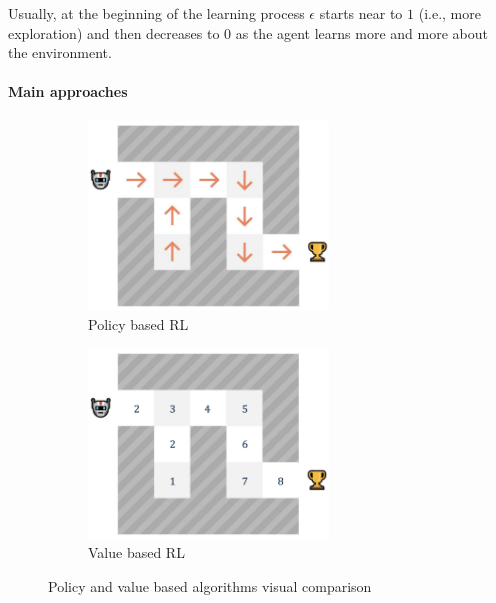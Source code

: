 \documentclass[12pt,a4paper,openright,twoside]{book}
\begin{document}
    Usually, at the beginning of the learning process $\epsilon$ starts near to $1$ (i.e., more exploration) and then decreases
    to $0$ as the agent learns more and more about the environment. 

\paragraph{Main approaches} %

\begin{figure}[t]
    \begin{subfigure}[b]{0.49\textwidth}
        \centering
        \includegraphics[width=0.7\textwidth]{figures/policy-based-rl.png}
        \caption{Policy based RL}
        \label{fig:policy-based-rl}
    \end{subfigure}
    \begin{subfigure}[b]{0.49\textwidth}
        \centering
        \includegraphics[width=0.7\textwidth]{figures/value-based-rl.png}
        \caption{Value based RL}
        \label{fig:value-based-rl}
    \end{subfigure}
\caption{Policy and value based algorithms visual comparison}\vspace{-10pt}
\end{figure}
\end{document}
